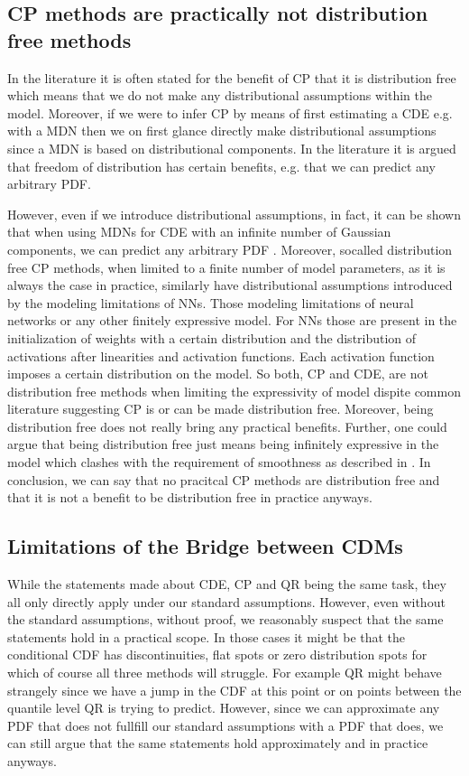 \subsection{CP methods are practically not distribution free methods}
In the literature it is often stated for the benefit of CP that it is distribution free \cite{angelopoulos2021gentle} which means that we do not make any distributional assumptions within the model. Moreover, if we were to infer CP by means of first estimating a CDE e.g. with a MDN then we on first glance directly make distributional assumptions since a MDN is based on distributional components. In the literature it is argued that freedom of distribution has certain benefits, e.g. that we can predict any arbitrary PDF.

However, even if we introduce distributional assumptions, in fact, it can be shown that when using MDNs for CDE with an infinite number of Gaussian components, we can predict any arbitrary PDF \cite{bishop1994mixture}. Moreover, socalled distribution free CP methods, when limited to a finite number of model parameters, as it is always the case in practice, similarly have distributional assumptions introduced by the modeling limitations of NNs. Those modeling limitations of neural networks or any other finitely expressive model. For NNs those are present in the initialization of weights with a certain distribution and the distribution of activations after linearities and activation functions. Each activation function imposes a certain distribution on the model. So both, CP and CDE, are not distribution free methods when limiting the expressivity of model dispite common literature suggesting CP is or can be made distribution free. Moreover, being distribution free does not really bring any practical benefits. Further, one could argue that being distribution free just means being infinitely expressive in the model which clashes with the requirement of smoothness as described in . In conclusion, we can say that no pracitcal CP methods are distribution free and that it is not a benefit to be distribution free in practice anyways.

\subsection{Limitations of the Bridge between CDMs}

While the statements made about CDE, CP and QR being the same task, they all only directly apply under our standard assumptions. However, even without the standard assumptions, without proof, we reasonably suspect that the same statements hold in a practical scope. In those cases it might be that the conditional CDF has discontinuities, flat spots or zero distribution spots for which of course all three methods will struggle. For example QR might behave strangely since we have a jump in the CDF at this point or on points between the quantile level QR is trying to predict. However, since we can approximate any PDF that does not fullfill our standard assumptions with a PDF that does, we can still argue that the same statements hold approximately and in practice anyways.

